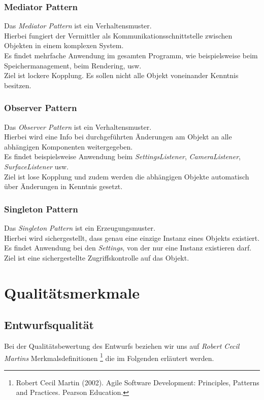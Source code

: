 \documentclass[10pt]{scrreprt}
\begin{document}
\subsection{Mediator Pattern}
Das \textit{Mediator Pattern} ist ein Verhaltensmuster. \\ Hierbei fungiert der Vermittler als Kommunikationsschnittstelle zwischen Objekten in einem komplexen System.\\ Es findet mehrfache Anwendung im gesamten Programm, wie beispielsweise beim Speichermanagement, beim Rendering, usw. \\ Ziel ist lockere Kopplung. Es sollen nicht alle Objekt voneinander Kenntnis besitzen.



\subsection{Observer Pattern}
Das \textit{Observer Pattern} ist ein Verhaltensmuster. \\ Hierbei wird eine Info bei durchgeführten Änderungen am Objekt an alle abhängigen Komponenten weitergegeben. \\ Es findet beispielsweise Anwendung beim \textit{SettingsListener}, \textit{CameraListener}, \textit{SurfaceListener} usw. \\ 
Ziel ist lose Kopplung und zudem werden die abhängigen Objekte automatisch über Änderungen in Kenntnis gesetzt.

\subsection{Singleton Pattern}
Das \textit{Singleton Pattern} ist ein Erzeugungsmuster. \\ Hierbei wird sichergestellt, dass genau eine einzige Instanz eines Objekts existiert. \\ Es findet Anwendung bei den \textit{Settings}, von der nur eine Instanz existieren darf. \\ Ziel ist eine sichergestellte Zugriffskontrolle auf das Objekt.




\chapter{Qualitätsmerkmale}
\section{Entwurfsqualität}
Bei der Qualitätsbewertung des Entwurfs beziehen wir uns auf \textit{Robert Cecil Martins} Merkmalsdefinitionen \footnote{Robert Cecil Martin (2002). Agile Software Development: Principles, Patterns and Practices. Pearson Education.} die im Folgenden erläutert werden.
\end{document}
